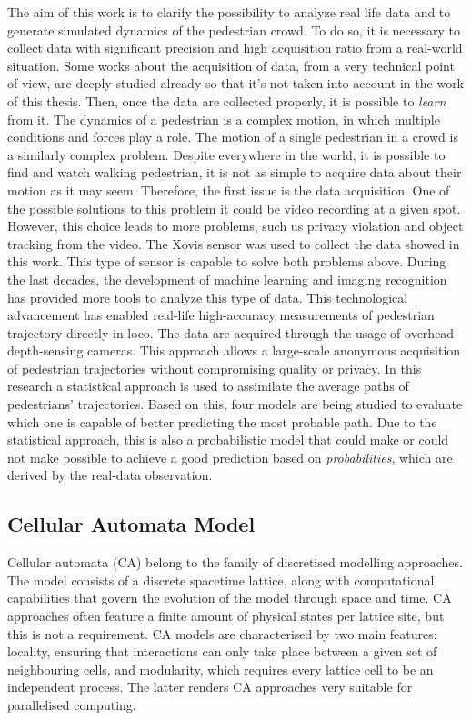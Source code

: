 \documentclass[class=article, crop=false]{standalone}
\begin{document}
The aim of this work is to clarify the possibility to analyze real life data and to generate simulated dynamics of the pedestrian crowd. 
To do so, it is necessary to collect data with significant precision and high acquisition ratio from a real-world situation. 
Some works about the acquisition of data, from a very technical point of view, are deeply studied already \cite{alecorbe} so that it's not taken into account in the work of this thesis.
Then, once the data are collected properly, it is possible to \emph{learn} from it. 
The dynamics of a pedestrian is a complex motion, in which multiple conditions and forces play a role. 
The motion of a single pedestrian in a crowd is a similarly complex problem. 
Despite everywhere in the world, it is possible to find and watch walking pedestrian, it is not as simple to acquire data about their motion as it may seem. 
Therefore, the first issue is the data acquisition. 
One of the possible solutions to this problem it could be video recording at a given spot. 
However, this choice leads to more problems, such us privacy violation and object tracking from the video. 
The Xovis sensor \cite{Xovis} was used to collect the data showed in this work. 
This type of sensor is capable to solve both problems above. During the last decades, the development of machine learning and imaging recognition has provided more tools to analyze this type of data. 
This technological advancement has enabled real-life high-accuracy measurements of pedestrian trajectory directly in loco. 
The data are acquired through the usage of overhead depth-sensing cameras. 
This approach allows a large-scale anonymous acquisition of pedestrian trajectories without compromising quality or privacy. 
In this research a statistical approach is used to assimilate the average paths of pedestrians’ trajectories. 
Based on this, four models are being studied to evaluate which one is capable of better predicting the most probable path. 
Due to the statistical approach, this is also a probabilistic model that could make or could not make possible to achieve a good prediction based on \emph{probabilities}, which are derived by the real-data observation.


\subsection{Cellular Automata Model}
Cellular automata (CA) belong to the family of discretised modelling approaches. The model consists of a discrete spacetime lattice, along with computational capabilities that govern the evolution of the model through space and time. CA approaches often feature a finite amount of physical states per lattice site, but this is not a requirement. CA models are characterised by two main features: locality, ensuring that interactions can only take place between a given set of neighbouring cells, and modularity, which requires every lattice cell to be an independent process. The latter renders CA approaches very suitable for parallelised computing.
\end{document}
